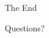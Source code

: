 \documentclass[t]{beamer}
\begin{document}
%


\begin{frame}[c]
\Huge{\centerline{The End}}
\Huge{\centerline{Questions?}}
\end{frame}


\appendix
%


%
%

\end{document}
